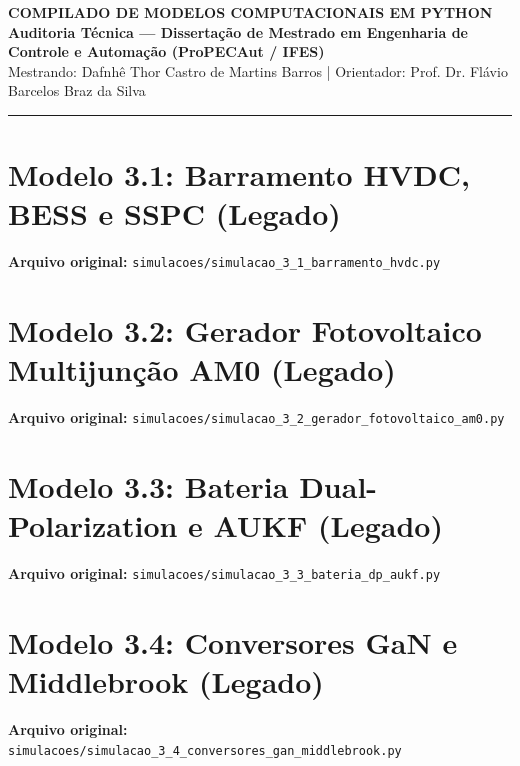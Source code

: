 \documentclass[10pt,a4paper]{article}
\begin{document}
\begin{center}
    {\Large\textbf{\color{ifesgreen}COMPILADO DE MODELOS COMPUTACIONAIS EM PYTHON}}\\[4pt]
    {\normalsize\textbf{Auditoria Técnica — Dissertação de Mestrado em Engenharia de Controle e Automação (ProPECAut / IFES)}}\\[4pt]
    {\small Mestrando: Dafnhê Thor Castro de Martins Barros \;|\; Orientador: Prof. Dr. Flávio Barcelos Braz da Silva}\\[4pt]
    \rule{\textwidth}{1pt}
\end{center}

\tableofcontents
\newpage
\section{Modelo 3.1: Barramento HVDC, BESS e SSPC (Legado)}
\noindent\textbf{Arquivo original:} \texttt{simulacoes/simulacao\_3\_1\_barramento\_hvdc.py}\\[4pt]
\newpage
\section{Modelo 3.2: Gerador Fotovoltaico Multijunção AM0 (Legado)}
\noindent\textbf{Arquivo original:} \texttt{simulacoes/simulacao\_3\_2\_gerador\_fotovoltaico\_am0.py}\\[4pt]
\newpage
\section{Modelo 3.3: Bateria Dual-Polarization e AUKF (Legado)}
\noindent\textbf{Arquivo original:} \texttt{simulacoes/simulacao\_3\_3\_bateria\_dp\_aukf.py}\\[4pt]
\newpage
\section{Modelo 3.4: Conversores GaN e Middlebrook (Legado)}
\noindent\textbf{Arquivo original:} \texttt{simulacoes/simulacao\_3\_4\_conversores\_gan\_middlebrook.py}\\[4pt]
\newpage
\end{document}
